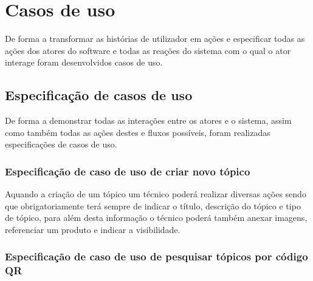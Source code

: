 \section{Casos de uso}
De forma a transformar as histórias de utilizador em ações e especificar todas as ações dos atores do 
software e todas as reações do sistema com o qual o ator interage foram desenvolvidos casos de uso.


\newpage

\subsection{Especificação de casos de uso}

De forma a demonstrar todas as interações entre os atores e o sistema, assim como também todas as ações 
destes e fluxos possíveis, foram realizadas especificações de casos de uso.

\subsubsection{Especificação de caso de uso de criar novo tópico}

Aquando a criação de um tópico um técnico poderá realizar diversas ações sendo que obrigatoriamente 
terá sempre de indicar o título, descrição do tópico e tipo de tópico, para além desta informação o técnico poderá também
anexar imagens, referenciar um produto e indicar a visibilidade.





% 


\subsubsection{Especificação de caso de uso de pesquisar tópicos por código QR}

